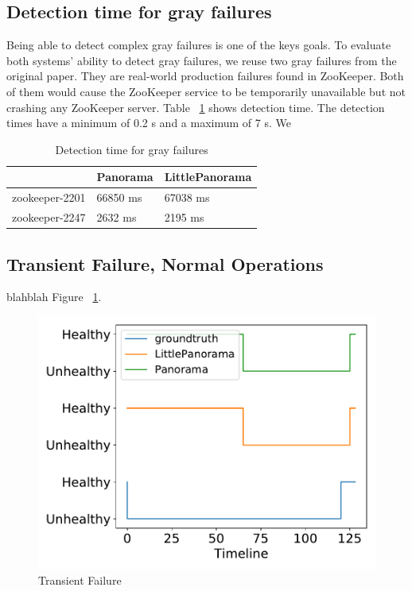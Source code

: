 \subsection{Detection time for gray failures}
Being able to detect complex gray failures is one of the keys goals. To evaluate both systems' ability to detect gray failures, we reuse two gray failures from the original paper. They are real-world production failures found in ZooKeeper. Both of them would cause the ZooKeeper service to be temporarily unavailable but not crashing any ZooKeeper server. Table ~\ref{tab:grayperf} shows detection time. The detection times have a minimum of 0.2 s and a maximum of 7 s. We 

\begin{table}[!tb]
\begin{tabular}{p{}p{}p{}}%

\toprule
 & \textbf{Panorama} & \textbf{LittlePanorama} \\
\midrule
  zookeeper-2201    &   66850 ms   &  67038 ms \\
  zookeeper-2247    &   2632 ms    &  2195 ms  \\
\bottomrule
\end{tabular}
\vspace{0.5em}
\caption{Detection time for gray failures}
\label{tab:grayperf}
\end{table}

\subsection{Transient Failure, Normal Operations}
blahblah Figure ~\ref{fig:transient}.

\begin{figure}[!tb]
\centering
\includegraphics[scale=0.4]{figs/transient.pdf}
\vspace{-1em}
\caption{Transient Failure
\label{fig:transient}
}
\end{figure}

